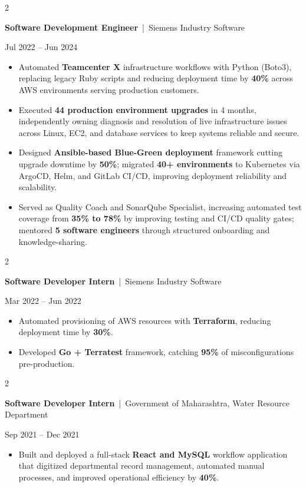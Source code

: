 \documentclass[10pt, letterpaper]{article}
\newenvironment{highlights}{
    \begin{itemize}[
        topsep=0.10 cm,
        parsep=0.06 cm,
        partopsep=0pt,
        itemsep=0.06 cm,
        leftmargin=12pt
    ]
}{
    \end{itemize}
}
\newenvironment{twocolentry}[2][]{
    \onecolentry
    \def\secondColumn{#2}
    \setcolumnwidth{\fill, 4.5 cm}
    \begin{paracol}{2}
}{
    \switchcolumn \raggedleft \secondColumn
    \end{paracol}
    \endonecolentry
}
\begin{document}
\vspace{0.15 cm}

\begin{twocolentry}{Jul 2022 -- Jun 2024}
\textbf{Software Development Engineer} \,|\, Siemens Industry Software
\end{twocolentry}
\begin{highlights}
  \item Automated \textbf{Teamcenter X} infrastructure workflows with Python (Boto3), replacing legacy Ruby scripts and reducing deployment time by \textbf{40\%} across AWS environments serving production customers.
  \item Executed \textbf{44 production environment upgrades} in 4 months, independently owning diagnosis and resolution of live infrastructure issues across Linux, EC2, and database services to keep systems reliable and secure.
  \item Designed \textbf{Ansible-based Blue-Green deployment} framework cutting upgrade downtime by \textbf{50\%}; migrated \textbf{40+ environments} to Kubernetes via ArgoCD, Helm, and GitLab CI/CD, improving deployment reliability and scalability.
  \item Served as Quality Coach and SonarQube Specialist, increasing automated test coverage from \textbf{35\% to 78\%} by improving testing and CI/CD quality gates; mentored \textbf{5 software engineers} through structured onboarding and knowledge-sharing.
\end{highlights}

\vspace{0.15 cm}

\begin{twocolentry}{Mar 2022 -- Jun 2022}
\textbf{Software Developer Intern} \,|\, Siemens Industry Software
\end{twocolentry}
\begin{highlights}
  \item Automated provisioning of AWS resources with \textbf{Terraform}, reducing deployment time by \textbf{30\%}.
  \item Developed \textbf{Go + Terratest} framework, catching \textbf{95\%} of misconfigurations pre-production.
\end{highlights}

\vspace{0.15 cm}

\begin{twocolentry}{Sep 2021 -- Dec 2021}
\textbf{Software Developer Intern} \,|\, Government of Maharashtra, Water Resource Department
\end{twocolentry}
\begin{highlights}
  \item Built and deployed a full-stack \textbf{React and MySQL} workflow application that digitized departmental record management, automated manual processes, and improved operational efficiency by \textbf{40\%}.
\end{highlights}
\end{document}
